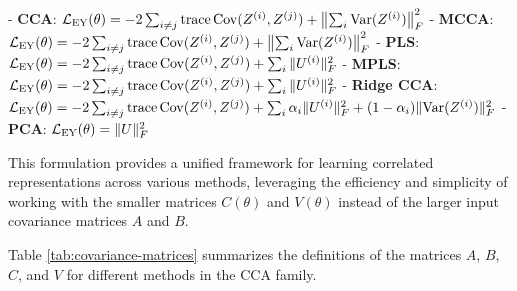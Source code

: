 - \textbf{CCA}: \(\mathcal{L}_\text{EY}(\theta) = -2 \sum_{i \neq j} \operatorname{trace} \mathrm{Cov}(Z^{(i)}, Z^{(j)}) + \left\|\sum_{i} \mathrm{Var}(Z^{(i)})\right\|_F^2\)
- \textbf{MCCA}: \(\mathcal{L}_\text{EY}(\theta) = -2 \sum_{i \neq j} \operatorname{trace} \mathrm{Cov}(Z^{(i)}, Z^{(j)}) + \left\|\sum_{i} \mathrm{Var}(Z^{(i)})\right\|_F^2\)
- \textbf{PLS}: \(\mathcal{L}_\text{EY}(\theta) = -2 \sum_{i \neq j} \operatorname{trace} \mathrm{Cov}(Z^{(i)}, Z^{(j)}) + \sum_{i} \|U^{(i)}\|_F^2\)
- \textbf{MPLS}: \(\mathcal{L}_\text{EY}(\theta) = -2 \sum_{i \neq j} \operatorname{trace} \mathrm{Cov}(Z^{(i)}, Z^{(j)}) + \sum_{i} \|U^{(i)}\|_F^2\)
- \textbf{Ridge CCA}: \(\mathcal{L}_\text{EY}(\theta) = -2 \sum_{i \neq j} \operatorname{trace} \mathrm{Cov}(Z^{(i)}, Z^{(j)}) + \sum_i \alpha_i \|U^{(i)}\|_F^2 + (1 - \alpha_i) \|\mathrm{Var}(Z^{(i)})\|_F^2\)
- \textbf{PCA}: \(\mathcal{L}_\text{EY}(\theta) = \|U\|_F^2\)

This formulation provides a unified framework for learning correlated representations across various methods, leveraging the efficiency and simplicity of working with the smaller matrices \(C(\theta)\) and \(V(\theta)\) instead of the larger input covariance matrices \(A\) and \(B\).

Table \ref{tab:covariance-matrices} summarizes the definitions of the matrices $A$, $B$, $C$, and $V$ for different methods in the CCA family.

